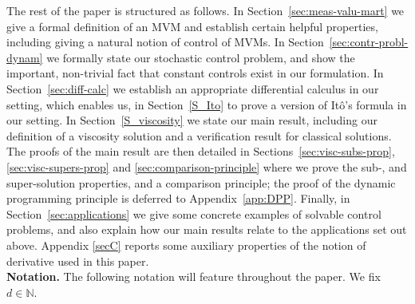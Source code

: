 \documentclass{article}
\theoremstyle{definition}
\numberwithin{equation}{section}
\numberwithin{theorem}{section}
\newcommand{\N}{{\mathbb N}}
\begin{document}
The rest of the paper is structured as follows. In
Section~\ref{sec:meas-valu-mart} we give a formal definition of an MVM
and establish certain helpful properties, including giving a natural
notion of control of MVMs. In Section~\ref{sec:contr-probl-dynam} we formally state our stochastic control
problem, and show the important, non-trivial fact that constant
controls exist in our formulation. In Section~\ref{sec:diff-calc} we
establish an appropriate differential calculus in our setting, which
enables us, in Section~\ref{S_Ito} to prove a version of It\^o's formula
in our setting. In Section~\ref{S_viscosity} we state our main result,
including our definition of a viscosity solution and a verification
result for classical solutions. The proofs of the
main result are then detailed in Sections~\ref{sec:visc-subs-prop},
\ref{sec:visc-supers-prop} and \ref{sec:comparison-principle} where we
prove the sub-, and super-solution properties, and a comparison
principle; the proof of the dynamic programming principle is deferred to Appendix~\ref{app:DPP}.
Finally, in Section~\ref{sec:applications} we give some
concrete examples of solvable control problems, and also explain how
our main results relate to the applications set out above.
Appendix \ref{secC} reports some auxiliary properties of the notion of derivative used in this paper. \\


\noindent\textbf{Notation.}
The following notation will feature throughout the paper. We fix $d \in \N$.
\end{document}
